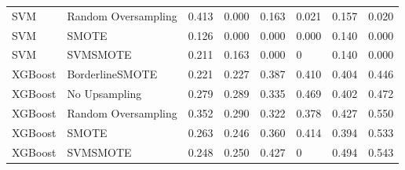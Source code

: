 \begin{tabular}{llllllll}
                         SVM & Random Oversampling & 0.413 &                     0.000 &                 0.163 &                  0.021 &                                   0.157 &    0.020 \\
                         SVM &               SMOTE & 0.126 &                     0.000 &                 0.000 &                  0.000 &                                   0.140 &    0.000 \\
                         SVM &            SVMSMOTE & 0.211 &                     0.163 &                 0.000 &                      0 &                                   0.140 &    0.000 \\
                     XGBoost &     BorderlineSMOTE & 0.221 &                     0.227 &                 0.387 &                  0.410 &                                   0.404 &    0.446 \\
                     XGBoost &       No Upsampling & 0.279 &                     0.289 &                 0.335 &                  0.469 &                                   0.402 &    0.472 \\
                     XGBoost & Random Oversampling & 0.352 &                     0.290 &                 0.322 &                  0.378 &                                   0.427 &    0.550 \\
                     XGBoost &               SMOTE & 0.263 &                     0.246 &                 0.360 &                  0.414 &                                   0.394 &    0.533 \\
                     XGBoost &            SVMSMOTE & 0.248 &                     0.250 &                 0.427 &                      0 &                                   0.494 &    0.543 \\
\bottomrule
\end{tabular}
